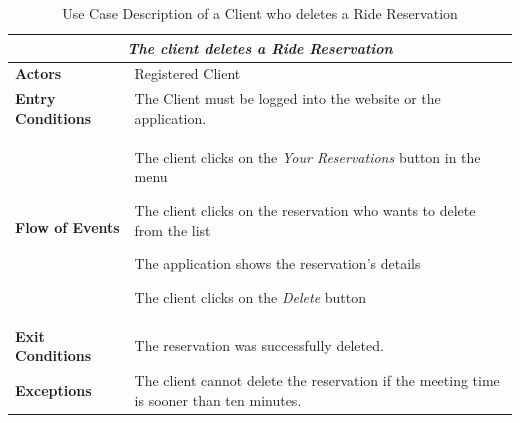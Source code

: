 \documentclass[a4paper]{article}
\begin{document}
\begin{table} [H]
\begin{center}
\begin{tabular}{ |m{}|m{}|  }
\hline
    \multicolumn{2}{|c|}{\textbf{\textit{The client deletes a Ride Reservation }}} \\
\hline \hline
    \textbf{Actors}
&   Registered Client
\\ \hline
    \textbf{Entry Conditions}
&   The Client must be logged into the website or the application.
\\ \hline
    \textbf{Flow of Events}
& 
    \begin{enumerate*}
    \item The client clicks on the \emph{Your Reservations} button in the menu
    \item The client clicks on the reservation who wants to delete from the list
    \item The application shows the reservation's details
    \item The client clicks on the \emph{Delete} button
    \end{enumerate*}
\\ \hline
    \textbf{Exit Conditions}
&   The reservation was successfully deleted.
\\ \hline
    \textbf{Exceptions}
&   The client cannot delete the reservation if the meeting time is sooner than ten minutes.
\\ \hline
\end{tabular}
\end{center}
\caption{Use Case Description of a Client who deletes a Ride Reservation}
\label{table:clientdeleteridereservation}
\end{table}
\end{document}
